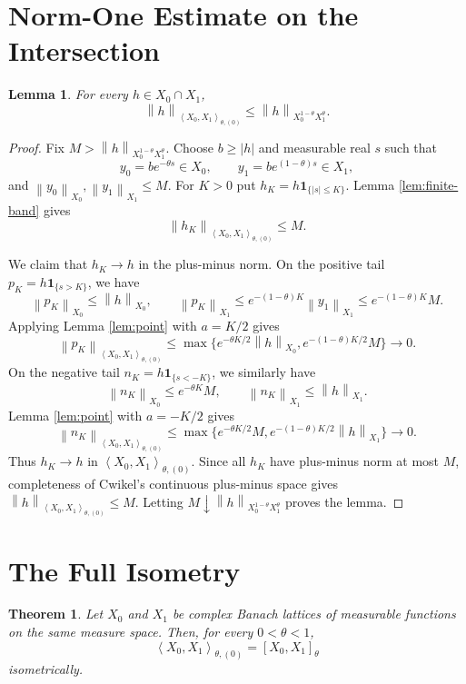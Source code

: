 \documentclass[11pt]{article}
\newtheorem{theorem}{Theorem}
\newtheorem{lemma}{Lemma}
\newcommand{\PM}{\left\langle X_0,X_1\right\rangle_{\theta,(0)}}
\newcommand{\Cal}{X_0^{1-\theta}X_1^\theta}
\newcommand{\norm}[1]{\left\lVert #1\right\rVert}
\newcommand{\one}{\mathbf 1}
\begin{document}
\section*{Norm-One Estimate on the Intersection}

\begin{lemma}
\label{lem:intersection}
For every $h\in X_0\cap X_1$,
\[
\norm{h}_{\PM}\le \norm{h}_{\Cal}.
\]
\end{lemma}

\begin{proof}
Fix $M>\norm{h}_{\Cal}$.  Choose $b\ge |h|$ and measurable real $s$
such that
\[
y_0=b e^{-\theta s}\in X_0,\qquad
y_1=b e^{(1-\theta)s}\in X_1,
\]
and $\norm{y_0}_{X_0},\norm{y_1}_{X_1}\le M$.
For $K>0$ put $h_K=h\one_{\{|s|\le K\}}$.  Lemma
\ref{lem:finite-band} gives
\[
\norm{h_K}_{\PM}\le M.
\]

We claim that $h_K\to h$ in the plus-minus norm.  On the positive tail
$p_K=h\one_{\{s>K\}}$, we have
\[
\norm{p_K}_{X_0}\le\norm{h}_{X_0},\qquad
\norm{p_K}_{X_1}\le e^{-(1-\theta)K}\norm{y_1}_{X_1}\le e^{-(1-\theta)K}M.
\]
Applying Lemma \ref{lem:point} with $a=K/2$ gives
\[
\norm{p_K}_{\PM}
\le
\max\{e^{-\theta K/2}\norm{h}_{X_0},
      e^{-(1-\theta)K/2}M\}\to0.
\]
On the negative tail $n_K=h\one_{\{s<-K\}}$, we similarly have
\[
\norm{n_K}_{X_0}\le e^{-\theta K}M,\qquad
\norm{n_K}_{X_1}\le \norm{h}_{X_1}.
\]
Lemma \ref{lem:point} with $a=-K/2$ gives
\[
\norm{n_K}_{\PM}
\le
\max\{e^{-\theta K/2}M,
      e^{-(1-\theta)K/2}\norm{h}_{X_1}\}\to0.
\]
Thus $h_K\to h$ in $\PM$.  Since all $h_K$ have plus-minus norm at
most $M$, completeness of Cwikel's continuous plus-minus space
\cite[Section 5]{Cwikel2015} gives $\norm{h}_{\PM}\le M$.  Letting
$M\downarrow\norm{h}_{\Cal}$ proves the lemma.
\end{proof}

\section*{The Full Isometry}

\begin{theorem}
\label{thm:full}
Let $X_0$ and $X_1$ be complex Banach lattices of measurable functions
on the same measure space.  Then, for every $0<\theta<1$,
\[
\left\langle X_0,X_1\right\rangle_{\theta,(0)}
=
\left[X_0,X_1\right]_\theta
\]
isometrically.
\end{theorem}
\end{document}
